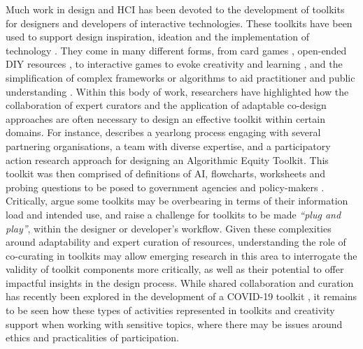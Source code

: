 Much work in design and HCI has been devoted to the development of toolkits for designers and developers of interactive technologies. These toolkits have been used to support design inspiration, ideation and the implementation of technology \citep{jarusriboonchai2018thinking}. They come in many different forms, from card games \citep{mora2017tiles}, open-ended DIY resources \citep{meissner_-it-yourself_2017}, to interactive games to evoke creativity and learning \citep{ellis2021tapeblocks}, and the simplification of complex frameworks or algorithms to aid practitioner and public understanding \citep{lee2021landscape}. Within this body of work, researchers have highlighted how the collaboration of expert curators and the application of adaptable co-design approaches are often necessary to design an effective toolkit within certain domains. For instance, \cite{krafft2021action} describes a yearlong process engaging with several partnering organisations, a team with diverse expertise, and a participatory action research approach for designing an Algorithmic Equity Toolkit. This toolkit was then comprised of definitions of AI, flowcharts, worksheets and probing questions to be posed to government agencies and policy-makers \citep{katell2020toward}. Critically, \cite{lee2021landscape} argue some toolkits may be overbearing in terms of their information load and intended use, and raise a challenge for toolkits to be made \textit{``plug and play''}, within the designer or developer’s workflow. Given these complexities around adaptability and expert curation of resources, understanding the role of co-curating in toolkits may allow emerging research in this area to interrogate the validity of toolkit components more critically, as well as their potential to offer impactful insights in the design process. While shared collaboration and curation has recently been explored in the development of a COVID-19 toolkit \citep{braybrooke2020together}, it remains to be seen how these types of activities represented in toolkits and creativity support when working with sensitive topics, where there may be issues around ethics and practicalities of participation. 

